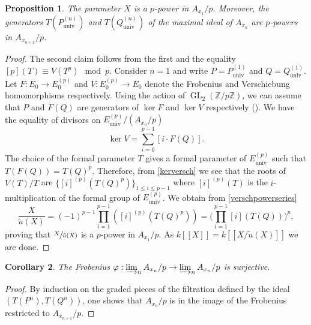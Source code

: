 \documentclass[JEP,XML,SOM,Unicode,published]{cedram}
\newcommand{\lcr}{[\![}
\newcommand{\rcr}{]\!]}
\newcommand{\univ}{\mathrm{univ}}
\numberwithin{equation}{section}
\newtheorem{prop}{Proposition}[section]
\newtheorem{cor}[prop]{Corollary}
\theoremstyle{definition}
\newcommand{\bb}[1]{\mathbb{#1}}
\DeclareMathOperator{\GL}{GL}
\begin{document}
\begin{prop}
\label{propSuperSingFrob}
The parameter $X$ is a $p$-power in $A_{x_1}/p$. Moreover, the generators $T(P^{(n)}_{\univ})$ and $T(Q^{(n)}_{\univ})$ of the maximal ideal of $A_{x_n}$ are $p$-powers in $A_{x_{n+1}}/p$.
\end{prop}

\begin{proof}
The second claim follows from the first and the equality $[p](T)\equiv V(T^p) \mod p$. Consider $n=1$ and write $P=P^{(1)}_{\univ}$ and $Q=Q^{(1)}_{\univ}$. Let $F: E_0\to E_0^{(p)}$ and $V: E_0^{(p)}\to E_0$ denote the Frobenius and Verschiebung homomorphisms respectively. Using the action of $\GL_2(\bb{Z}/p\bb{Z})$, we can assume that $P$ and $F(Q)$ are generators of $\ker F$ and $\ker V$ respectively (\cf \cite[Th.\,5.5.2]{katz1985arithmetic}). We have the equality of divisors on $E_{\univ}^{(p)}/(A_{x_n}/p)$
\begin{equation}
\label{kerversch}
\ker V= \sum_{i=0}^{p-1} [i\cdot F(Q)].
\end{equation}
The choice of the formal parameter $T$ gives a formal parameter of $E^{(p)}_{\univ}$ such that $T(F(Q))=T(Q)^p$. Therefore, from \eqref{kerversch} we see that the roots of $V(T)/T$ are $\{[i]^{(p)}(T(Q)^p)\}_{1\leq i\leq p-1}$ where $[i]^{(p)}(T)$ is the $i$-multiplication of the formal group of $E^{(p)}_{\univ}$. We obtain from \eqref{verschpowerseries}
\[
\frac{X}{\tilde{u}(X)}= (-1)^{p-1} \prod_{i=1}^{p-1} ([i]^{(p)}(T(Q)^p))= \biggl(\prod_{i=1}^{p-1}[i](T(Q))\biggr)^p,
\]
proving that $\sfrac{X}{\tilde{u}(X)}$ is a $p$-power in $A_{x_1}/p$. As $k\lcr X\rcr=k\lcr X/\tilde{u}(X)\rcr$ we are done.
\end{proof}

\begin{cor}
\label{corsupersingfrob}
The Frobenius $\varphi: \varinjlim_n A_{x_n}/p \to \varinjlim_n A_{x_n}/p$ is surjective.
\end{cor}

\begin{proof}
By induction on the graded pieces of the filtration defined by the ideal $(T(P^n),T(Q^n))$, one shows that $A_{x_n}/p$ is in the image of the Frobenius restricted to $A_{x_{n+1}}/p$.
\end{proof}
\end{document}
